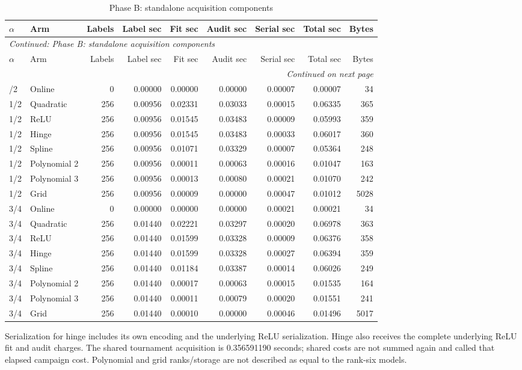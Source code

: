 \begingroup\footnotesize\setlength{\tabcolsep}{3pt}
\begin{longtable}{llrrrrrrr}
\caption{Phase B: standalone acquisition components}\label{tab:acquisition119b}\\
\toprule
$\alpha$ & Arm & Labels & Label sec & Fit sec & Audit sec & Serial sec & Total sec & Bytes\\\midrule
\endfirsthead
\multicolumn{9}{l}{\textit{Continued: Phase B: standalone acquisition components}}\\
\toprule
$\alpha$ & Arm & Labels & Label sec & Fit sec & Audit sec & Serial sec & Total sec & Bytes\\\midrule
\endhead
\midrule\multicolumn{9}{r}{\textit{Continued on next page}}\\
\endfoot
\bottomrule
\endlastfoot
1/2 & Online & 0 & 0.00000 & 0.00000 & 0.00000 & 0.00007 & 0.00007 & 34 \\
1/2 & Quadratic & 256 & 0.00956 & 0.02331 & 0.03033 & 0.00015 & 0.06335 & 365 \\
1/2 & ReLU & 256 & 0.00956 & 0.01545 & 0.03483 & 0.00009 & 0.05993 & 359 \\
1/2 & Hinge & 256 & 0.00956 & 0.01545 & 0.03483 & 0.00033 & 0.06017 & 360 \\
1/2 & Spline & 256 & 0.00956 & 0.01071 & 0.03329 & 0.00007 & 0.05364 & 248 \\
1/2 & Polynomial 2 & 256 & 0.00956 & 0.00011 & 0.00063 & 0.00016 & 0.01047 & 163 \\
1/2 & Polynomial 3 & 256 & 0.00956 & 0.00013 & 0.00080 & 0.00021 & 0.01070 & 242 \\
1/2 & Grid & 256 & 0.00956 & 0.00009 & 0.00000 & 0.00047 & 0.01012 & 5028 \\
3/4 & Online & 0 & 0.00000 & 0.00000 & 0.00000 & 0.00021 & 0.00021 & 34 \\
3/4 & Quadratic & 256 & 0.01440 & 0.02221 & 0.03297 & 0.00020 & 0.06978 & 363 \\
3/4 & ReLU & 256 & 0.01440 & 0.01599 & 0.03328 & 0.00009 & 0.06376 & 358 \\
3/4 & Hinge & 256 & 0.01440 & 0.01599 & 0.03328 & 0.00027 & 0.06394 & 359 \\
3/4 & Spline & 256 & 0.01440 & 0.01184 & 0.03387 & 0.00014 & 0.06026 & 249 \\
3/4 & Polynomial 2 & 256 & 0.01440 & 0.00017 & 0.00063 & 0.00015 & 0.01535 & 164 \\
3/4 & Polynomial 3 & 256 & 0.01440 & 0.00011 & 0.00079 & 0.00020 & 0.01551 & 241 \\
3/4 & Grid & 256 & 0.01440 & 0.00010 & 0.00000 & 0.00046 & 0.01496 & 5017 \\
\end{longtable}
\noindent Serialization for hinge includes its own encoding and the underlying ReLU serialization. Hinge also receives the complete underlying ReLU fit and audit charges. The shared tournament acquisition is 0.356591190 seconds; shared costs are not summed again and called that elapsed campaign cost. Polynomial and grid ranks/storage are not described as equal to the rank-six models.
\endgroup
